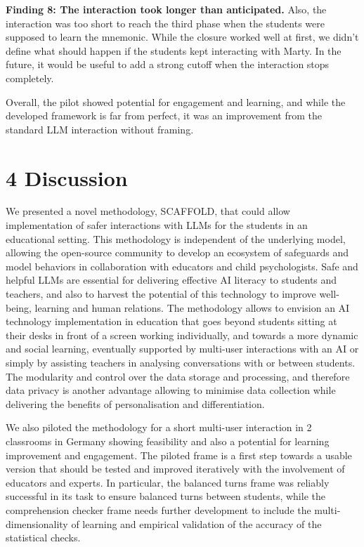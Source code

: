 \documentclass[fleqn,10pt]{wlscirep}
\begin{document}
\textbf{Finding 8: The interaction took longer than anticipated.} Also, the interaction was too short to reach the third phase when the students were supposed to learn the mnemonic. While the closure worked well at first, we didn't define what should happen if the students kept interacting with Marty. In the future, it would be useful to add a strong cutoff when the interaction stops completely.

Overall, the pilot showed potential for engagement and learning, and while the developed framework is far from perfect, it was an improvement from the standard LLM interaction without framing.

\clearpage

\section*{4 Discussion}

We presented a novel methodology, SCAFFOLD, that could allow implementation of safer interactions with LLMs for the students in an educational setting. This methodology is independent of the underlying model, allowing the open-source community to develop an ecosystem of safeguards and model behaviors in collaboration with educators and child psychologists. Safe and helpful LLMs are essential for delivering effective AI literacy to students and teachers, and also to harvest the potential of this technology to improve well-being, learning and human relations. The methodology allows to envision an AI technology implementation in education that goes beyond students sitting at their desks in front of a screen working individually, and towards a more dynamic and social learning, eventually supported by multi-user interactions with an AI or simply by assisting teachers in analysing conversations with or between students. The modularity and control over the data storage and processing, and therefore data privacy is another advantage allowing to minimise data collection while delivering the benefits of personalisation and differentiation.

We also piloted the methodology for a short multi-user interaction in 2 classrooms in Germany showing feasibility and also a potential for learning improvement and engagement. The piloted frame is a first step towards a usable version that should be tested and improved iteratively with the involvement of educators and experts. In particular, the balanced turns frame was reliably successful in its task to ensure balanced turns between students, while the comprehension checker frame needs further development to include the multi-dimensionality of learning and empirical validation of the accuracy of the statistical checks.
\end{document}
